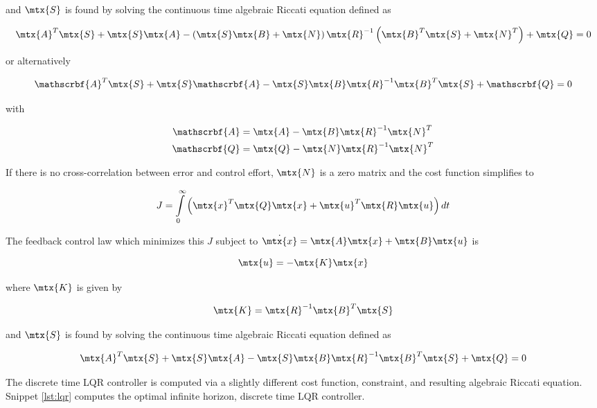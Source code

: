 and $\mtx{S}$ is found by solving the continuous time algebraic Riccati equation
defined as

\begin{equation*}
  \mtx{A}^T\mtx{S} + \mtx{S}\mtx{A} - \left(\mtx{S}\mtx{B} +
    \mtx{N}\right) \mtx{R}^{-1} \left(\mtx{B}^T\mtx{S} + \mtx{N}^T\right) +
    \mtx{Q} = 0
\end{equation*}

or alternatively

\begin{equation*}
  \mathscrbf{A}^T\mtx{S} + \mtx{S}\mathscrbf{A} -
    \mtx{S}\mtx{B}\mtx{R}^{-1}\mtx{B}^T\mtx{S} + \mathscrbf{Q} = 0
\end{equation*}

with

\begin{align*}
  \mathscrbf{A} &= \mtx{A} - \mtx{B}\mtx{R}^{-1}\mtx{N}^T \\
  \mathscrbf{Q} &= \mtx{Q} - \mtx{N}\mtx{R}^{-1}\mtx{N}^T
\end{align*}

If there is no cross-correlation between \gls{error} and \gls{control effort},
$\mtx{N}$ is a zero matrix and the cost function simplifies to

\begin{equation*}
  J = \int\limits_0^\infty
    \left(\mtx{x}^T\mtx{Q}\mtx{x} + \mtx{u}^T\mtx{R}\mtx{u}\right) dt
\end{equation*}

The feedback \gls{control law} which minimizes this $J$ subject to
$\dot{\mtx{x}} = \mtx{A}\mtx{x} + \mtx{B}\mtx{u}$ is

\begin{equation*}
  \mtx{u} = -\mtx{K}\mtx{x}
\end{equation*}

where $\mtx{K}$ is given by

\begin{equation*}
  \mtx{K} = \mtx{R}^{-1}\mtx{B}^T\mtx{S}
\end{equation*}

and $\mtx{S}$ is found by solving the continuous time algebraic Riccati equation
defined as

\begin{equation*}
  \mtx{A}^T\mtx{S} + \mtx{S}\mtx{A} -
    \mtx{S}\mtx{B}\mtx{R}^{-1}\mtx{B}^T\mtx{S} + \mtx{Q} = 0
\end{equation*}

The discrete time LQR \gls{controller} is computed via a slightly different cost
function, constraint, and resulting algebraic Riccati equation. Snippet
\ref{lst:lqr} computes the optimal infinite horizon, discrete time LQR
\gls{controller}.

